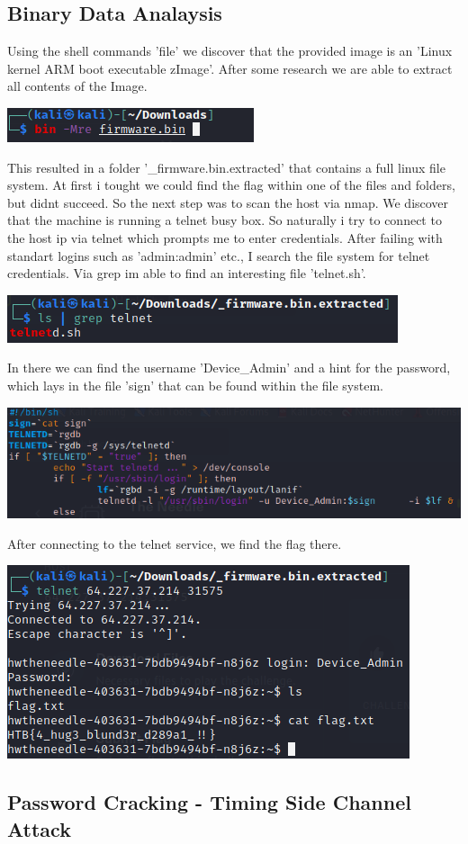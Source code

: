 \documentclass[a4paper,10pt]{article}
\begin{document}
\subsection{Binary Data Analaysis}
Using the shell commands 'file' we discover that the provided image is an 'Linux kernel ARM boot executable zImage'. After some research we are able to extract all contents of the Image.
\begin{center}
\includegraphics[scale=0.6]{binwalk.png}
\end{center}
This resulted in a folder '\_firmware.bin.extracted\/' that contains a full linux file system. At first i tought we could find the flag within one of the files and folders, but didnt succeed.
So the next step was to scan the host via nmap. We discover that the machine is running a telnet busy box. So naturally i try to connect to the host ip via telnet which prompts me to enter credentials. After failing with standart logins such as 'admin:admin' etc.,  I search the file system for telnet credentials. Via grep im able to find an interesting file 'telnet.sh'.
\begin{center}
\includegraphics[scale=0.5]{telnet.png}
\end{center}
In there we can find the username 'Device\_Admin' and a hint for the password, which lays in the file 'sign' that can be found within the file system.
\begin{center}
\includegraphics[scale=0.5]{telnetf.png} 
\end{center}
\newpage
After connecting to the telnet service, we find the flag there.
\begin{center}
 \includegraphics[scale=0.5]{flag.png}
\end{center}
\subsection{Password Cracking - Timing Side Channel Attack}
\end{document}
